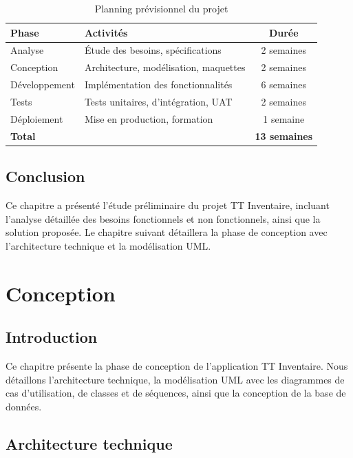 \documentclass[12pt,a4paper]{report}
\begin{document}
\begin{table}[H]
\centering
\caption{Planning prévisionnel du projet}
\begin{tabularx}{\textwidth}{|l|X|c|}
\hline
\textbf{Phase} & \textbf{Activités} & \textbf{Durée} \\
\hline
Analyse & Étude des besoins, spécifications & 2 semaines \\
\hline
Conception & Architecture, modélisation, maquettes & 2 semaines \\
\hline
Développement & Implémentation des fonctionnalités & 6 semaines \\
\hline
Tests & Tests unitaires, d'intégration, UAT & 2 semaines \\
\hline
Déploiement & Mise en production, formation & 1 semaine \\
\hline
\textbf{Total} & & \textbf{13 semaines} \\
\hline
\end{tabularx}
\end{table}

\section{Conclusion}

Ce chapitre a présenté l'étude préliminaire du projet TT Inventaire, incluant l'analyse détaillée des besoins fonctionnels et non fonctionnels, ainsi que la solution proposée. Le chapitre suivant détaillera la phase de conception avec l'architecture technique et la modélisation UML.

\chapter{Conception}

\section{Introduction}

Ce chapitre présente la phase de conception de l'application TT Inventaire. Nous détaillons l'architecture technique, la modélisation UML avec les diagrammes de cas d'utilisation, de classes et de séquences, ainsi que la conception de la base de données.

\section{Architecture technique}
\end{document}
